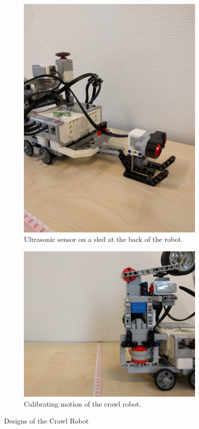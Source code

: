 \documentclass[11pt, a4paper]{article}
\begin{document}
	\begin{figure}[H]
		\centering
		
		\begin{subfigure}{0.4\textwidth}
			\centering
			\includegraphics[width=0.8\linewidth]{images/crawl_sled}
			\caption{Ultrasonic sensor on a sled at the back of the robot.}
			\label{fig:sub2}
		\end{subfigure}
		\begin{subfigure}{.4\textwidth}
			\centering
			\includegraphics[width=1\linewidth]{images/crawl_calibrate}
			\caption{Calibrating motion of the crawl robot.}
			\label{fig:sub1}
		\end{subfigure}%
		\caption{Designs of the Crawl Robot}
		\label{fig:test}
	\end{figure}
	
\end{document}
